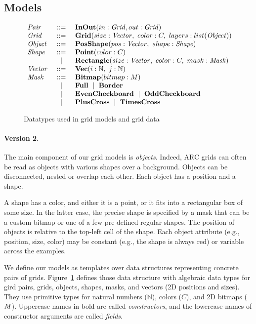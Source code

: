\documentclass[a4paper]{llncs}
\newenvironment{datatype}{$\begin{array}{lcl}}{\end{array}$}
\newcommand{\is}{&\ ::=\ &}
\newcommand{\alter}{\ \mid\ }
\newcommand{\altis}{\\ &\ \mid\ &}
\newcommand{\nat}{\mathbb{N}}
\begin{document}
\subsection{Models}
\label{model}

\begin{figure}[t]
\begin{center}
\begin{datatype}
  {\it Pair} \is {\bf InOut}(in: {\it Grid}, out: {\it Grid})
  \\
  {\it Grid} \is {\bf Grid}(size: {\it Vector},\ color: C,\ layers: list({\it Object}))
  \\
  {\it Object} \is {\bf PosShape}(pos: {\it Vector},\ shape: {\it Shape})
  \\
  {\it Shape} \is {\bf Point}(color: C)
  \altis {\bf Rectangle}(size: {\it Vector},\ color: C,\ mask: {\it Mask})
  \\
  {\it Vector} \is {\bf Vec}(i: \nat,\ j: \nat)
  \\
  {\it Mask} \is {\bf Bitmap}(bitmap: M)
  \altis {\bf Full} \alter {\bf Border}
  \altis {\bf EvenCheckboard} \alter {\bf OddCheckboard}
  \altis {\bf PlusCross} \alter {\bf TimesCross}
\end{datatype}
\end{center}
\caption{Datatypes used in grid models and grid data}
\label{fig:patterns}
\end{figure}

\paragraph{Version 2.}
The main component of our grid models is {\em objects}. Indeed, ARC
grids can often be read as objects with various shapes over a
background. Objects can be disconnected, nested or overlap each
other. Each object has a position and a shape.

A shape has a color, and either it is a point, or it fits into a
rectangular box of some size. In the latter case, the precise shape is
specified by a mask that can be a custom bitmap or one of a few
pre-defined regular shapes. The position of objects is relative to the
top-left cell of the shape. Each object attribute (e.g., position,
size, color) may be constant (e.g., the shape is always red) or
variable across the examples.

We define our models as templates over data structures representing
concrete pairs of grids. Figure~\ref{fig:patterns} defines those data
structure with algebraic data types for gird pairs, grids, objects,
shapes, masks, and vectors (2D positions and sizes). They use
primitive types for natural numbers ($\nat$), colors ($C$), and 2D
bitmaps (${\it M}$). Uppercase names in bold are called {\em
  constructors}, and the lowercase names of constructor arguments are
called {\em fields}.
\end{document}
